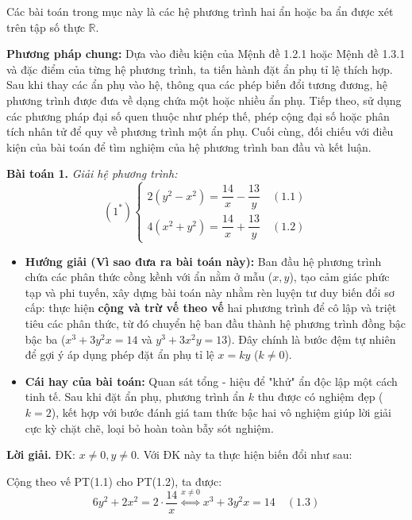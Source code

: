 \documentclass[12pt]{report}
\begin{document}
\vspace{0.3cm}
\noindent Các bài toán trong mục này là các hệ phương trình hai ẩn hoặc ba ẩn được xét trên tập số thực $\mathbb{R}$.

\vspace{0.3cm}
\noindent \textbf{Phương pháp chung:} Dựa vào điều kiện của Mệnh đề 1.2.1 hoặc Mệnh đề 1.3.1 và đặc điểm của từng hệ phương trình, ta tiến hành đặt ẩn phụ tỉ lệ thích hợp. Sau khi thay các ẩn phụ vào hệ, thông qua các phép biến đổi tương đương, hệ phương trình được đưa về dạng chứa một hoặc nhiều ẩn phụ. Tiếp theo, sử dụng các phương pháp đại số quen thuộc như phép thế, phép cộng đại số hoặc phân tích nhân tử để quy về phương trình một ẩn phụ. Cuối cùng, đối chiếu với điều kiện của bài toán để tìm nghiệm của hệ phương trình ban đầu và kết luận.

\vspace{0.4cm}
\noindent \textbf{Bài toán 1.} \textit{Giải hệ phương trình:}
\[ (1^*)
\begin{cases}
2(y^2 - x^2) = \dfrac{14}{x} - \dfrac{13}{y} \quad (1.1) \\[10pt]
4(x^2 + y^2) = \dfrac{14}{x} + \dfrac{13}{y} \quad (1.2)
\end{cases}
\]

\begin{itemize}
    \item[\textbf{1.}] \textbf{Hướng giải (Vì sao đưa ra bài toán này):} 
    Ban đầu hệ phương trình chứa các phân thức cồng kềnh với ẩn nằm ở mẫu ($x, y$), tạo cảm giác phức tạp và phi tuyến, xây dựng bài toán này nhằm rèn luyện tư duy biến đổi sơ cấp: thực hiện \textbf{cộng và trừ vế theo vế} hai phương trình để cô lập và triệt tiêu các phân thức, từ đó chuyển hệ ban đầu thành hệ phương trình đồng bậc bậc ba ($x^3 + 3y^2x = 14$ và $y^3 + 3x^2y = 13$). Đây chính là bước đệm tự nhiên để gợi ý áp dụng phép đặt ẩn phụ tỉ lệ $x = ky$ ($k \neq 0$).

    \item[\textbf{2.}] \textbf{Cái hay của bài toán:} 
    Quan sát tổng - hiệu để "khử" ẩn độc lập một cách tinh tế. Sau khi đặt ẩn phụ, phương trình ẩn $k$ thu được có nghiệm đẹp ($k=2$), kết hợp với bước đánh giá tam thức bậc hai vô nghiệm giúp lời giải cực kỳ chặt chẽ, loại bỏ hoàn toàn bẫy sót nghiệm.
\end{itemize}
\vspace{0.2cm}
\noindent \textbf{Lời giải.} ĐK: $x \neq 0, y \neq 0$. Với ĐK này ta thực hiện biến đổi như sau:

\vspace{0.2cm}
\noindent Cộng theo vế PT(1.1) cho PT(1.2), ta được:
\[
6y^2 + 2x^2 = 2 \cdot \dfrac{14}{x} \overset{x \neq 0}{\Leftrightarrow} x^3 + 3y^2x = 14 \quad (1.3)
\]
\end{document}
